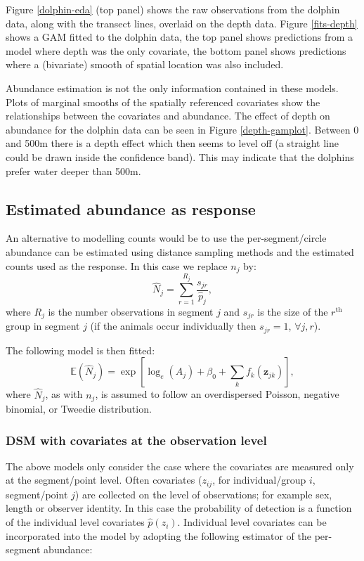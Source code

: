 \documentclass[a4paper,12pt]{article}
\begin{document}
Figure \ref{dolphin-eda} (top panel) shows the raw observations from the dolphin data, along with the transect lines, overlaid on the depth data. Figure \ref{fits-depth} shows a GAM fitted to the dolphin data, the top panel shows predictions from a model where depth was the only covariate, the bottom panel shows predictions where a (bivariate) smooth of spatial location was also included. 

Abundance estimation is not the only information contained in these models. Plots of marginal smooths of the spatially referenced covariates show the relationships between the covariates and abundance. The effect of depth on abundance for the dolphin data can be seen in Figure \ref{depth-gamplot}. Between 0 and 500m there is a depth effect which then seems to level off (a straight line could be drawn inside the confidence band). This may indicate that the dolphins prefer water deeper than 500m.


\subsection*{Estimated abundance as response}

An alternative to modelling counts would be to use the per-segment/circle abundance can be estimated using distance sampling methods and the estimated counts used as the response. In this case we replace $n_j$ by:
\begin{equation*}
\hat{N}_j = \sum_{r=1}^{R_j} \frac{s_{jr}}{\hat{p}_j},
\end{equation*}
where $R_j$ is the number observations in segment $j$ and $s_{jr}$ is the size of the $r^\text{th}$ group in segment $j$ (if the animals occur individually then $s_{jr}=1$, $\forall j,r$). 

The following model is then fitted:
\begin{equation*}
\mathbb{E}(\hat{N}_j) = \exp\left[ \log_e \left( A_j \right) + \beta_0 + \sum_k f_k\left(\bm{z}_{jk}\right) \right],
\end{equation*}
where $\hat{N}_j$, as with $n_j$, is assumed to follow an overdispersed Poisson, negative binomial, or Tweedie distribution.

\subsubsection*{DSM with covariates at the observation level}

The above models only consider the case where the covariates are measured only at the segment/point level. Often covariates ($z_{ij}$, for individual/group $i$, segment/point $j$) are collected on the level of observations; for example sex, length or observer identity. In this case the probability of detection is a function of the individual level covariates $\hat{p}(z_i)$. Individual level covariates can be incorporated into the model by adopting the following estimator of the per-segment abundance:
\end{document}
